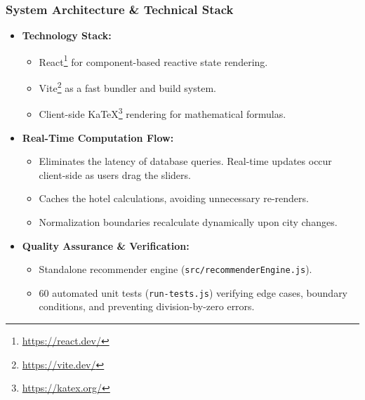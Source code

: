\begin{frame}
    \frametitle{System Architecture \& Technical Stack}
    \begin{itemize}
        \item \textbf{Technology Stack:}
            \begin{itemize}
                \item React\footnote{\url{https://react.dev/}} for component-based reactive state rendering.
                \item Vite\footnote{\url{https://vite.dev/}} as a fast bundler and build system.
                \item Client-side KaTeX\footnote{\url{https://katex.org/}} rendering for mathematical formulas.
            \end{itemize}
        \item \textbf{Real-Time Computation Flow:}
            \begin{itemize}
                \item Eliminates the latency of database queries. Real-time updates occur client-side as users drag the sliders.
                \item Caches the hotel calculations, avoiding unnecessary re-renders.
                \item Normalization boundaries recalculate dynamically upon city changes.
            \end{itemize}
        \item \textbf{Quality Assurance \& Verification:}
            \begin{itemize}
                \item Standalone recommender engine (\texttt{src/recommenderEngine.js}).
                \item 60 automated unit tests (\texttt{run-tests.js}) verifying edge cases, boundary conditions, and preventing division-by-zero errors.
            \end{itemize}
    \end{itemize}
\end{frame}

